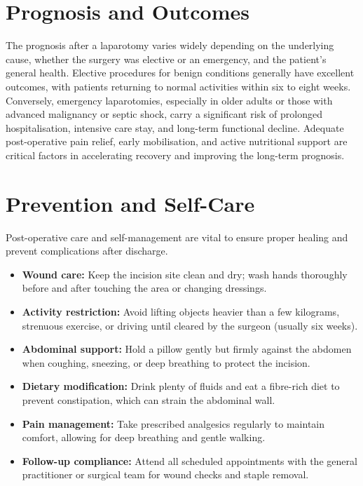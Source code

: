 \section*{Prognosis and Outcomes}
The prognosis after a laparotomy varies widely depending on the underlying cause, whether the surgery was elective or an emergency, and the patient's general health. Elective procedures for benign conditions generally have excellent outcomes, with patients returning to normal activities within six to eight weeks. Conversely, emergency laparotomies, especially in older adults or those with advanced malignancy or septic shock, carry a significant risk of prolonged hospitalisation, intensive care stay, and long-term functional decline. Adequate post-operative pain relief, early mobilisation, and active nutritional support are critical factors in accelerating recovery and improving the long-term prognosis.

\section*{Prevention and Self-Care}
Post-operative care and self-management are vital to ensure proper healing and prevent complications after discharge.

\begin{itemize}
    \item \textbf{Wound care:} Keep the incision site clean and dry; wash hands thoroughly before and after touching the area or changing dressings.
    \item \textbf{Activity restriction:} Avoid lifting objects heavier than a few kilograms, strenuous exercise, or driving until cleared by the surgeon (usually six weeks).
    \item \textbf{Abdominal support:} Hold a pillow gently but firmly against the abdomen when coughing, sneezing, or deep breathing to protect the incision.
    \item \textbf{Dietary modification:} Drink plenty of fluids and eat a fibre-rich diet to prevent constipation, which can strain the abdominal wall.
    \item \textbf{Pain management:} Take prescribed analgesics regularly to maintain comfort, allowing for deep breathing and gentle walking.
    \item \textbf{Follow-up compliance:} Attend all scheduled appointments with the general practitioner or surgical team for wound checks and staple removal.
\end{itemize}

